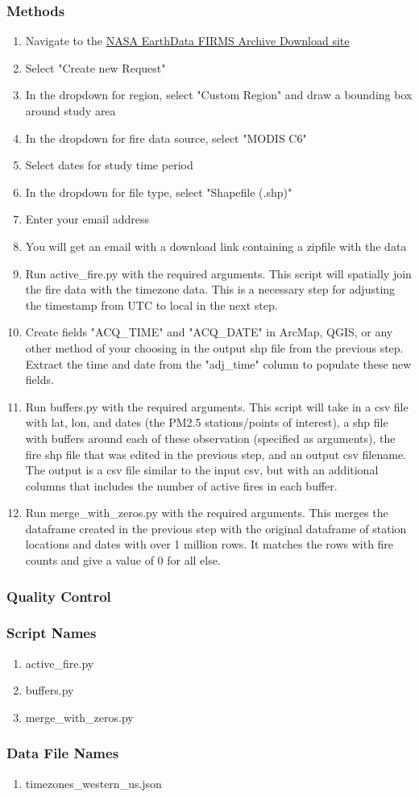 \subsubsection*{Methods}
\begin{enumerate}
\item Navigate to the \href{https://firms.modaps.eosdis.nasa.gov/download/}{NASA EarthData FIRMS Archive Download site}
\item Select "Create new Request"
\item In the dropdown for region, select "Custom Region" and draw a bounding box around study area
\item In the dropdown for fire data source, select "MODIS C6"
\item Select dates for study time period
\item In the dropdown for file type, select "Shapefile (.shp)"
\item Enter your email address
\item You will get an email with a download link containing a zipfile with the data
\item Run active\_fire.py with the required arguments. This script will spatially join the fire data with the timezone data. This is a necessary step for adjusting the timestamp from UTC to local in the next step.
\item Create fields "ACQ\_TIME" and "ACQ\_DATE" in ArcMap, QGIS, or any other method of your choosing in the output shp file from the previous step. Extract the time and date from the "adj\_time" column to populate these new fields. 
\item Run buffers.py with the required arguments. This script will take in a csv file with lat, lon, and dates (the PM2.5 stations/points of interest), a shp file with buffers around each of these observation (specified as arguments), the fire shp file that was edited in the previous step, and an output csv filename. The output is a csv file similar to the input csv, but with an additional columns that includes the number of active fires in each buffer.
\item Run merge\_with\_zeros.py with the required arguments. This merges the dataframe created in the previous step with the original dataframe of station locations and dates with over 1 million rows. It matches the rows with fire counts and give a value of 0 for all else.
\end{enumerate}
\subsubsection*{Quality Control}
\subsubsection*{Script Names}
\begin{enumerate}
\item active\_fire.py
\item buffers.py
\item merge\_with\_zeros.py
\end{enumerate}
\subsubsection*{Data File Names}
\begin{enumerate}
\item timezones\_western\_us.json
\end{enumerate}